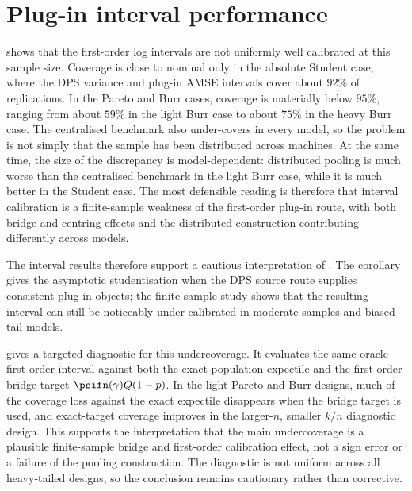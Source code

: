 \begin{table}[htbp]
\centering
\small
\caption{Sensitivity to deterministic bridge-Hill weights in the representative
main design. The pooled-Weissman weights are fixed at the DPS variance
choice.}
\label{tab:sim:nu}
\begingroup
\setlength{\tabcolsep}{4pt}

\endgroup
\end{table}

\section{Plug-in interval performance}
\label{sec:sim:intervals}

 shows that the first-order log intervals are
not uniformly well calibrated at this sample size. Coverage is close to
nominal only in the absolute Student case, where the DPS variance and plug-in
AMSE intervals cover about \(92\%\) of replications. In the Pareto and Burr
cases, coverage is materially below \(95\%\), ranging from about \(59\%\) in
the light Burr case to about \(75\%\) in the heavy Burr case. The centralised
benchmark also under-covers in every model, so the problem is not simply that
the sample has been distributed across machines. At the same time, the size of
the discrepancy is model-dependent: distributed pooling is much worse than
the centralised benchmark in the light Burr case, while it is much better in
the Student case. The most defensible reading is therefore that interval
calibration is a finite-sample weakness of the first-order plug-in route, with
both bridge and centring effects and the distributed construction contributing
differently across models.

The interval results therefore support a cautious interpretation of
. The corollary gives the asymptotic
studentisation when the DPS source route supplies consistent plug-in objects;
the finite-sample study shows that the resulting interval can still be
noticeably under-calibrated in moderate samples and biased tail models.

 gives a targeted diagnostic for this
undercoverage. It evaluates the same oracle first-order interval against both
the exact population expectile and the first-order bridge target
\(\psifn(\gamma)Q(1-p)\). In the light Pareto and Burr designs, much of the
coverage loss against the exact expectile disappears when the bridge target is
used, and exact-target coverage improves in the larger-\(n\), smaller
\(k/n\) diagnostic design. This supports the interpretation that the main
undercoverage is a plausible finite-sample bridge and first-order calibration
effect, not a sign error or a failure of the pooling construction. The
diagnostic is not uniform across all heavy-tailed designs, so the conclusion
remains cautionary rather than corrective.

